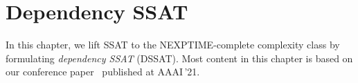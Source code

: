 \chapter{Dependency SSAT}
\label{chap:dependency-ssat}

In this chapter, we lift SSAT to the NEXPTIME-complete complexity class by formulating \textit{dependency SSAT} (DSSAT).
Most content in this chapter is based on our conference paper~\cite{LeeAAAI21DSSAT} published at AAAI\,'21.



